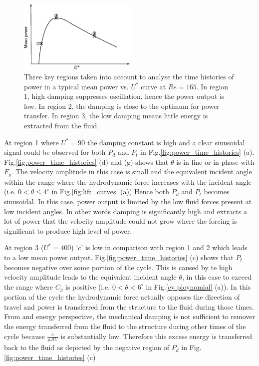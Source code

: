 \begin{figure}[h!]
\centering
\includegraphics[width=0.5\textwidth]{../FnP/sketch_1}
\caption{ Three key regions taken into account to analyse the time histories of power in a typical mean power vs. $U^*$ curve at $Re=165$. In region 1, high damping suppresses oscillation, hence the power output is low. In region 2, the damping is close to the optimum for power transfer. In region 3, the low damping means little energy is extracted from the fluid.}
\label{fig:regions_1}
\end{figure}

 
 
 
 At region 1 where $U^*=90$ the damping constant is high and a clear sinusoidal signal could be observed for both $P_d$ and $P_t$ in Fig.\ref{fig:power_time_histories} (a). Fig.\ref{fig:power_time_histories} (d) and (g) shows that $\theta$ is in line or in phase with $F_y$.  The velocity amplitude in this case is small and the equivalent incident angle within the range where the hydrodynamic force increases with the incident angle (i.e. $0<\theta \leq 4^\circ$ in Fig.\ref{fig:lift_curves} (a)) Hence both $P_d$ and $P_t$ becomes sinusoidal. In this case, power output is limited by the low fluid forces present at low incident angles. In other words damping is significantly high and extracts a lot of power that the velocity amplitude could not grow where the forcing  is significant to produce high level of power.   
 
 
  At region 3 ($U^*= 400$) `$c$' is low in comparison with region 1 and 2 which leads to a low mean power output. Fig.\ref{fig:power_time_histories} (c) shows that $P_t$ becomes negative over some portion of the cycle. This is caused by te high velocity amplitude leads to the equivalent incident angle $\theta$, in this case to exceed the range where $C_y$ is positive (i.e. $0<\theta<6^\circ$ in Fig.\ref{cy ploynomial} (a)). In this portion of the cycle the hydrodynamic force actually opposes the direction of travel and power is transferred from the structure to the fluid during those times. From and energy perspective, the mechanical damping is not sufficient to remover the energy transferred from the fluid to the structure during other times of the cycle because $\frac{c}{\rho\mathcal{A}U}$ is substantially low. Therefore this excess energy is transferred back to the fluid as depicted by the negative region of $P_d$ in Fig.\ref{fig:power_time_histories} (c) 
 

